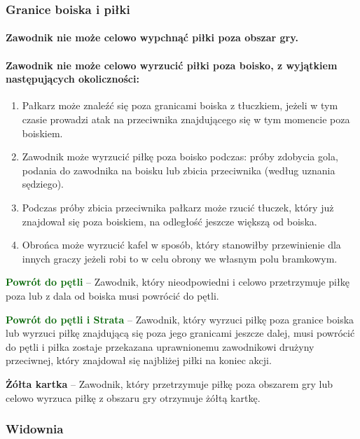 \documentclass[12pt]{article}
\newcommand\yellowcard[1]{\bgroup\textcolor{darkyellow}{\textbf{#1}}}
\newcommand\other[1]{\bgroup\textcolor{darkgreen}{\textbf{#1}}}
\begin{document}
\subsubsection{Granice boiska i piłki}

\paragraph{Zawodnik nie może celowo wypchnąć piłki poza obszar gry.}

\paragraph{Zawodnik nie może celowo wyrzucić piłki poza boisko, z
	wyjątkiem następujących okoliczności:}

\begin{enumerate}
	\item
	      Pałkarz może znaleźć się poza granicami boiska z tłuczkiem, jeżeli w
	      tym czasie prowadzi atak na przeciwnika znajdującego się w tym
	      momencie poza boiskiem.
	\item
	      Zawodnik może wyrzucić piłkę poza boisko podczas: próby zdobycia gola,
	      podania do zawodnika na boisku lub zbicia przeciwnika (według uznania
	      sędziego).
	\item
	      Podczas próby zbicia przeciwnika pałkarz może rzucić tłuczek, który
	      już znajdował się poza boiskiem, na odległość jeszcze większą od
	      boiska.
	\item
	      Obrońca może wyrzucić kafel w sposób, który stanowiłby przewinienie
	      dla innych graczy jeżeli robi to w celu obrony we własnym polu
	      bramkowym.
\end{enumerate}

\other{Powrót do pętli} -- Zawodnik, który nieodpowiedni i celowo
przetrzymuje piłkę poza lub z dala od boiska musi powrócić do pętli.

\other{Powrót do pętli i Strata} -- Zawodnik, który wyrzuci piłkę poza
granice boiska lub wyrzuci piłkę znajdującą się poza jego granicami
jeszcze dalej, musi powrócić do pętli i piłka zostaje przekazana
uprawnionemu zawodnikowi drużyny przeciwnej, który znajdował się
najbliżej piłki na koniec akcji.

\yellowcard{Żółta kartka} -- Zawodnik, który przetrzymuje piłkę poza obszarem
gry lub celowo wyrzuca piłkę z obszaru gry otrzymuje żółtą kartkę.

\subsubsection{Widownia}
\end{document}
